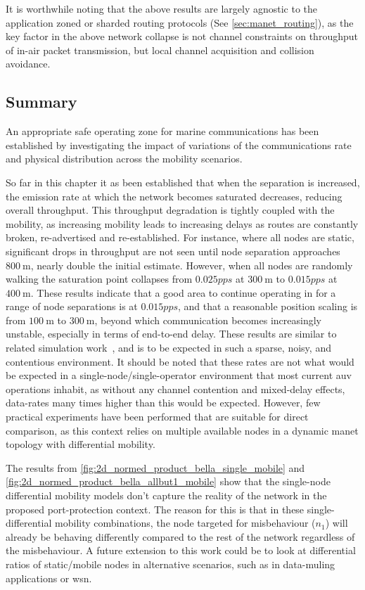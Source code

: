 It is worthwhile noting that the above results are largely agnostic to the application zoned or sharded routing protocols (See \autoref{sec:manet_routing}), as the key factor in the above network collapse is not channel constraints on throughput of in-air packet transmission, but local channel acquisition and collision avoidance.

\subsection{Summary}

An appropriate safe operating zone for marine communications has been established by investigating the impact of variations of the communications rate and physical distribution across the mobility scenarios.

So far in this chapter it as been established that when the separation is increased, the emission rate at which the network becomes saturated decreases, reducing overall throughput. 
This throughput degradation is tightly coupled with the mobility, as increasing mobility leads to increasing delays as routes are constantly broken, re-advertised and re-established. 
For instance, where all nodes are static, significant drops in throughput are not seen until node separation approaches $\SI{800}{\meter}$, nearly double the initial estimate. 
However, when all nodes are randomly walking the saturation point collapses from $0.025pps$ at $\SI{300}{\meter}$ to $0.015pps$ at $\SI{400}{\meter}$.
These results indicate that a good area to continue operating in for a range of node separations is at $0.015pps$, and that a reasonable position scaling is from $\SI{100}{\meter}$ to $\SI{300}{\meter}$, beyond which communication becomes increasingly unstable, especially in terms of end-to-end delay.
These results are similar to related simulation work~\cite{Miquel2008,Diamant2010,Noh2012}, and is to be expected in such a sparse, noisy, and contentious environment.
It should be noted that these rates are not what would be expected in a single-node/single-operator environment that most current \gls{auv} operations inhabit, as without any channel contention and mixed-delay effects, data-rates many times higher than this would be expected.
However, few practical experiments have been performed that are suitable for direct comparison, as this context relies on multiple available nodes in a dynamic \gls{manet} topology with differential mobility.


The results from \autoref{fig:2d_normed_product_bella_single_mobile} and \autoref{fig:2d_normed_product_bella_allbut1_mobile} show that the single-node differential mobility models don't capture the reality of the network in the proposed port-protection context.
The reason for this is that in these single-differential mobility combinations, the node targeted for misbehaviour ($n_1$) will already be behaving differently compared to the rest of the network regardless of the misbehaviour.
A future extension to this work could be to look at differential ratios of static/mobile nodes in alternative scenarios, such as in data-muling applications or \gls{wsn}.


